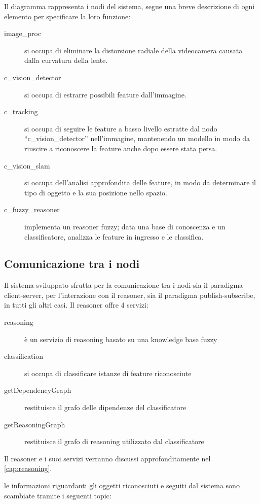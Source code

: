 Il diagramma rappresenta i nodi del sistema, segue una breve descrizione di ogni elemento per specificare la loro funzione:

\begin{description}
  \item [image\_proc] si occupa di eliminare la distorsione radiale della videocamera causata dalla curvatura della lente.
  \item [c\_vision\_detector] si occupa di estrarre possibili feature dall'immagine.
  \item [c\_tracking] si occupa di seguire le feature a basso livello estratte dal nodo ``c\_vision\_detector'' nell'immagine, mantenendo un modello in modo da riuscire a riconoscere la feature anche dopo essere stata persa. 
  \item [c\_vision\_slam] si occupa dell'analisi approfondita delle feature, in modo da determinare il tipo di oggetto e la sua posizione nello spazio. 
  \item [c\_fuzzy\_reasoner] implementa un reasoner fuzzy; data una base di conoscenza e un classificatore, analizza le feature in ingresso e le classifica. 
\end{description}


\subsection{Comunicazione tra i nodi}

Il sistema sviluppato sfrutta per la comunicazione tra i nodi sia il paradigma client-server, per l'interazione con il reasoner, sia il paradigma publish-subscribe, in tutti gli altri casi.
Il reasoner offre 4 servizi:

\begin{description}
 \item [\/reasoning] è un  servizio di reasoning basato su una knowledge base fuzzy
 \item [\/classification] si occupa di classificare istanze di feature riconosciute
 \item [\/getDependencyGraph] restituisce il grafo delle dipendenze del classificatore
 \item [\/getReasoningGraph] restituisce il grafo di reasoning utilizzato dal classificatore
\end{description}

Il reasoner e i suoi servizi verranno discussi approfonditamente  nel \autoref{cap:reasoning}.

le informazioni riguardanti gli oggetti riconosciuti e seguiti dal sistema sono scambiate tramite i seguenti topic:

